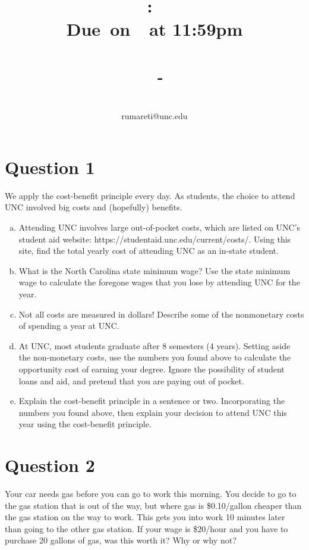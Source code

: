 \documentclass{article}
\title{
    \vspace{2in}
    \textmd{\textbf{\hmwkClass:\ \hmwkTitle}}\\
    \normalsize\vspace{0.1in}\small{\textbf{Due\ on\ \hmwkDueDate\ at 11:59pm}}\\
    \normalsize\text{Tuesday/Thursday 3:30-4:45, Genome Sciences 100}\\
    \vspace{0.1in}\large{\textit{\hmwkClassInstructor\ - \hmwkClassTime}}
    \vspace{3in}
}
\author{\hmwkAuthorName\\\small{rumareti@unc.edu}}
\date{}
\newcommand{\question}[1]{\pagebreak\section{Question #1}}
\begin{document}
\maketitle

\question{1}

We apply the cost-benefit principle every day. As students, the choice to attend UNC involved big costs and (hopefully) benefits.

\begin{enumerate}[(a)]

    \item Attending UNC involves large out-of-pocket costs, which are listed
    on UNC's student aid website:
    https://studentaid.unc.edu/current/costs/.
    Using this site, find the total yearly cost of attending UNC as an
    in-state student.

    \item What is the North Carolina state minimum wage? Use the state minimum wage to calculate the foregone wages that you lose by attending UNC for the year.

    \item Not all costs are measured in dollars! Describe some of the nonmonetary costs of spending a year at UNC.

    \item At UNC, most students graduate after 8 semesters (4 years). Setting aside the non-monetary costs, use the numbers you found
    above to calculate the opportunity cost of earning your degree. Ignore the possibility of student loans and aid, and pretend that
    you are paying out of pocket.

    \item Explain the cost-benefit principle in a sentence or two. Incorporating the numbers you found above, then explain your decision
    to attend UNC this year using the cost-benefit principle.
\end{enumerate}

\question{2} Your car needs gas before you can go to work this morning. You
decide to go to the gas station that is out of the way, but where gas
is \$0.10/gallon cheaper than the gas station on the way to work. This
gets you into work 10 minutes later than going to the other gas station.
If your wage is \$20/hour and you have to purchase 20 gallons of gas,
was this worth it? Why or why not?
\end{document}
